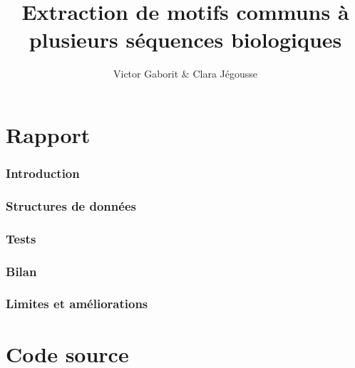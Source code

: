 \documentclass[11pt, oneside]{article}
\title{Extraction de motifs communs à plusieurs séquences biologiques}
\author{Victor Gaborit \& Clara Jégousse}
\date{}
\begin{document}

\maketitle

\setcounter{tocdepth}{3}
\tableofcontents

\part*{Rapport}

\section{Introduction} 

\section{Structures de données} 

\section{Tests}

\section{Bilan}

\section{Limites et améliorations}  

\part*{Code source}



\end{document}
